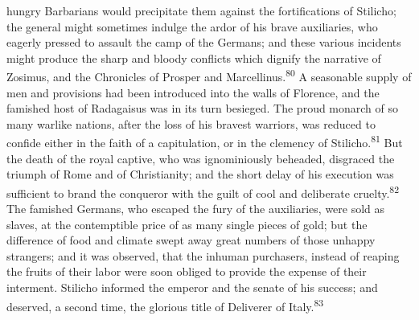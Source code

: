 hungry Barbarians would precipitate them against the
fortifications of Stilicho; the general might sometimes indulge
the ardor of his brave auxiliaries, who eagerly pressed to
assault the camp of the Germans; and these various incidents
might produce the sharp and bloody conflicts which dignify the
narrative of Zosimus, and the Chronicles of Prosper and
Marcellinus.\textsuperscript{80} A seasonable supply of men and provisions had
been introduced into the walls of Florence, and the famished host
of Radagaisus was in its turn besieged. The proud monarch of so
many warlike nations, after the loss of his bravest warriors, was
reduced to confide either in the faith of a capitulation, or in
the clemency of Stilicho.\textsuperscript{81} But the death of the royal captive,
who was ignominiously beheaded, disgraced the triumph of Rome and
of Christianity; and the short delay of his execution was
sufficient to brand the conqueror with the guilt of cool and
deliberate cruelty.\textsuperscript{82} The famished Germans, who escaped the fury
of the auxiliaries, were sold as slaves, at the contemptible
price of as many single pieces of gold; but the difference of
food and climate swept away great numbers of those unhappy
strangers; and it was observed, that the inhuman purchasers,
instead of reaping the fruits of their labor were soon obliged to
provide the expense of their interment. Stilicho informed the
emperor and the senate of his success; and deserved, a second
time, the glorious title of Deliverer of Italy.\textsuperscript{83}




